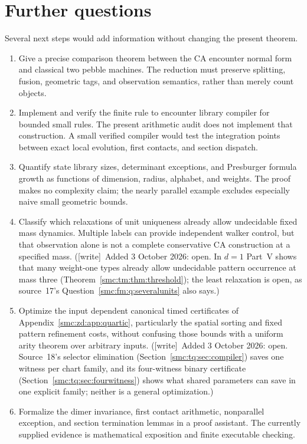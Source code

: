\documentclass[11pt,letterpaper]{article}
\numberwithin{equation}{section}
\theoremstyle{definition}
\theoremstyle{remark}
\newcommand{\wtag}{\textup{[write]}}
\begin{document}
\section{Further questions}\label{smc:zd:sec:questions}
Several next steps would add information without changing the present theorem.
\begin{enumerate}
\item\label{smc:zd:q:pebble} Give a precise comparison theorem between the CA encounter normal form and classical two pebble machines. The reduction must preserve splitting, fusion, geometric tags, and observation semantics, rather than merely count objects.
\item\label{smc:zd:q:compiler} Implement and verify the finite rule to encounter library compiler for bounded small rules. The present arithmetic audit does not implement that construction. A small verified compiler would test the integration points between exact local evolution, first contacts, and section dispatch.
\item\label{smc:zd:q:size} Quantify state library sizes, determinant exceptions, and Presburger formula growth as functions of dimension, radius, alphabet, and weights. The proof makes no complexity claim; the nearly parallel example excludes especially naive small geometric bounds.
\item\label{smc:zd:q:units} Classify which relaxations of unit uniqueness already allow undecidable fixed mass dynamics. Multiple labels can provide independent walker control, but that observation alone is not a complete conservative CA construction at a specified mass. (\wtag\ Added 3 October 2026: open. In $d=1$ Part~V shows that many weight-one types already allow undecidable pattern occurrence at mass three (Theorem~\ref{smc:tm:thm:threshold}); the least relaxation is open, as source~17's Question~\ref{smc:fm:q:severalunits} also says.)
\item\label{smc:zd:q:quartic} Optimize the input dependent canonical timed certificates of Appendix~\ref{smc:zd:app:quartic}, particularly the spatial sorting and fixed pattern refinement costs, without confusing those bounds with a uniform arity theorem over arbitrary inputs. (\wtag\ Added 3 October 2026: open. Source~18's selector elimination (Section~\ref{smc:tq:sec:compiler}) saves one witness per chart family, and its four-witness binary certificate (Section~\ref{smc:tq:sec:fourwitness}) shows what shared parameters can save in one explicit family; neither is a general optimization.)
\item\label{smc:zd:q:formal} Formalize the dimer invariance, first contact arithmetic, nonparallel exception, and section termination lemmas in a proof assistant. The currently supplied evidence is mathematical exposition and finite executable checking.
\end{enumerate}
\end{document}

